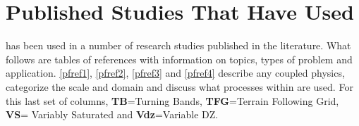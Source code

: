 \section{Published Studies That Have Used \parflow{}}
\label{lit_table}

\parflow{} has been used in a number of research studies published in the literature. 
What follows are tables of \parflow{} references with information on topics, types of problem and
application.  \ref{pfref1}, \ref{pfref2}, \ref{pfref3} and \ref{pfref4} describe any coupled physics, 
categorize the scale and domain and discuss what processes within \parflow{} are used.  For this last
set of columns, {\bf TB}=Turning Bands, {\bf TFG}=Terrain Following Grid, {\bf VS}= Variably Saturated
and {\bf Vdz}=Variable DZ.\\
\newpage

